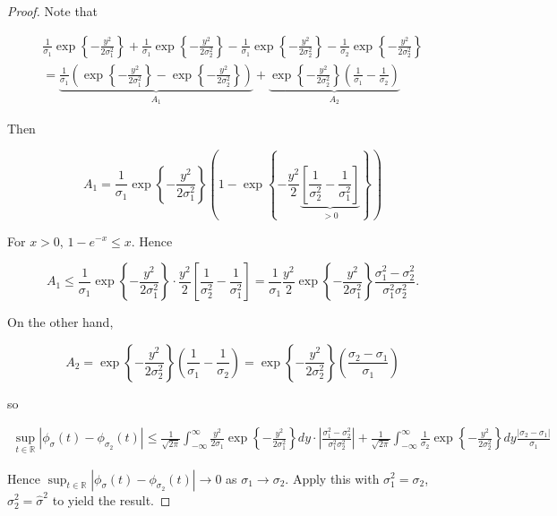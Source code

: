 \begin{proof}
Note that

\begin{multline*}
\frac{1}{ \sigma_1} \exp \left\{ - \frac{ y^2}{2 \sigma_1^2} \right\} + \frac{1}{ \sigma_1} \exp \left\{ - \frac{ y^2}{2 \sigma_2^2} \right\}  -  \frac{1}{ \sigma_1} \exp \left\{ - \frac{ y^2}{2 \sigma_2^2} \right\}  - \frac{1}{ \sigma_2} \exp \left\{ - \frac{ y^2}{2 \sigma_2^2} \right\}
\\ = \underbrace{ \frac{1}{ \sigma_1} \left(  \exp \left\{ - \frac{ y^2}{2 \sigma_1^2} \right\}  -   \exp \left\{ - \frac{ y^2}{2 \sigma_2^2} \right\}  \right)}_{A_1} + \underbrace{ \exp \left\{ - \frac{ y^2}{2 \sigma_2^2} \right\}  \left(  \frac{1}{ \sigma_1}- \frac{1}{ \sigma_2} \right)}_{A_2}
\end{multline*} 

Then

\[
A_1 = \frac{1}{\sigma_1} \exp \left\{ - \frac{ y^2}{2 \sigma_1^2} \right\} \left( 1 - \exp \left\{ - \frac{ y^2}{2 } \underbrace{\left[  \frac{1}{\sigma_2^2} - \frac{1}{\sigma_1^2} \right]}_{>0} \right\} \right)
\]

For \(x > 0\), \(1 - e^{-x} \leq x\). Hence

\[
A_1 \leq \frac{1}{\sigma_1} \exp \left\{ - \frac{ y^2}{2 \sigma_1^2} \right\}  \cdot  \frac{ y^2}{2 } \left[  \frac{1}{\sigma_2^2} - \frac{1}{\sigma_1^2} \right] = \frac{1}{\sigma_1} \frac{y^2}{2} \exp \left\{ - \frac{ y^2}{2 \sigma_1^2} \right\} \frac{ \sigma_1^2 - \sigma_2^2}{\sigma_1^2 \sigma_2^2}.
\]

On the other hand,

\[
A_2 = \exp \left\{ - \frac{ y^2}{2 \sigma_2^2} \right\}  \left(  \frac{1}{ \sigma_1}- \frac{1}{ \sigma_2} \right) = \exp \left\{ - \frac{ y^2}{2 \sigma_2^2} \right\}  \left(\frac{\sigma_2 - \sigma_1}{\sigma_1} \right)
\]


so

\begin{multline*}
 \sup_{t \in \mathbb{R}} \left| \phi_\sigma(t) - \phi_{\sigma_2}(t) \right| 
 \leq \frac{1}{\sqrt{2\pi}} \int_{-\infty}^\infty \frac{y^2}{2 \sigma_1} \exp \left\{- \frac{y^2}{2 \sigma_1^2} \right\} dy \cdot \left|  \frac{\sigma_1^2 - \sigma_2^2}{\sigma_1^2 \sigma_2^2} \right| 
 + \frac{1}{\sqrt{2\pi}} \int_{-\infty}^\infty \frac{1}{\sigma_2} \exp \left\{ - \frac{y^2}{2 \sigma_2^2} \right\} dy \frac{ |\sigma_2 - \sigma_1|}{\sigma_1}
\end{multline*}

Hence \( \sup_{t \in \mathbb{R}} \left| \phi_\sigma(t) - \phi_{\sigma_2}(t) \right| \to 0\) as \(\sigma_1 \to \sigma_2\). Apply this with \(\sigma_1^2 = \sigma_2\), \(\sigma_2^2 = \hat{\sigma}^2\) to yield the result.


\end{proof}

